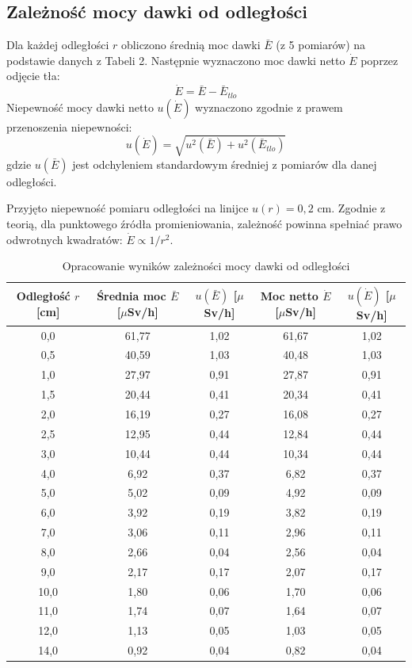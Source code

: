 \documentclass{article}
\begin{document}
\subsection{Zależność mocy dawki od odległości}
Dla każdej odległości $r$ obliczono średnią moc dawki $\bar{E}$ (z 5 pomiarów) na podstawie danych z Tabeli 2. Następnie wyznaczono moc dawki netto $\dot{E}$ poprzez odjęcie tła:
\begin{equation}
\dot{E} = \bar{E} - \bar{E}_{tlo}
\end{equation}
Niepewność mocy dawki netto $u(\dot{E})$ wyznaczono zgodnie z prawem przenoszenia niepewności:
\begin{equation}
u(\dot{E}) = \sqrt{u^2(\bar{E}) + u^2(\bar{E}_{tlo})}
\end{equation}
gdzie $u(\bar{E})$ jest odchyleniem standardowym średniej z pomiarów dla danej odległości.

Przyjęto niepewność pomiaru odległości na linijce $u(r) = 0,2$ cm. Zgodnie z teorią, dla punktowego źródła promieniowania, zależność powinna spełniać prawo odwrotnych kwadratów: $\dot{E} \propto 1/r^2$.

\begin{table}[H]
\centering
\caption{Opracowanie wyników zależności mocy dawki od odległości}
\small
\renewcommand{\arraystretch}{1.2}
\begin{tabular}{|c|c|c|c|c|}
\hline
\textbf{Odległość $r$ [cm]} & \textbf{Średnia moc $\bar{E}$ [$\mu$Sv/h]} & \textbf{$u(\bar{E})$ [$\mu$Sv/h]} & \textbf{Moc netto $\dot{E}$ [$\mu$Sv/h]} & \textbf{$u(\dot{E})$ [$\mu$Sv/h]} \\ \hline
0,0 & 61,77 & 1,02 & 61,67 & 1,02 \\ \hline
0,5 & 40,59 & 1,03 & 40,48 & 1,03 \\ \hline
1,0 & 27,97 & 0,91 & 27,87 & 0,91 \\ \hline
1,5 & 20,44 & 0,41 & 20,34 & 0,41 \\ \hline
2,0 & 16,19 & 0,27 & 16,08 & 0,27 \\ \hline
2,5 & 12,95 & 0,44 & 12,84 & 0,44 \\ \hline
3,0 & 10,44 & 0,44 & 10,34 & 0,44 \\ \hline
4,0 & 6,92 & 0,37 & 6,82 & 0,37 \\ \hline
5,0 & 5,02 & 0,09 & 4,92 & 0,09 \\ \hline
6,0 & 3,92 & 0,19 & 3,82 & 0,19 \\ \hline
7,0 & 3,06 & 0,11 & 2,96 & 0,11 \\ \hline
8,0 & 2,66 & 0,04 & 2,56 & 0,04 \\ \hline
9,0 & 2,17 & 0,17 & 2,07 & 0,17 \\ \hline
10,0 & 1,80 & 0,06 & 1,70 & 0,06 \\ \hline
11,0 & 1,74 & 0,07 & 1,64 & 0,07 \\ \hline
12,0 & 1,13 & 0,05 & 1,03 & 0,05 \\ \hline
14,0 & 0,92 & 0,04 & 0,82 & 0,04 \\ \hline
\end{tabular}
\end{table}
\end{document}

